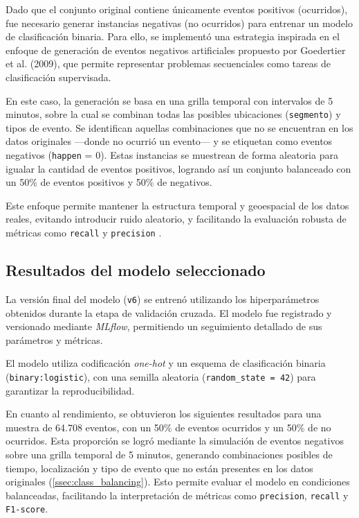 \documentclass[12pt]{article}
\begin{document}
{Dado que el conjunto original contiene únicamente eventos positivos (ocurridos), fue necesario generar instancias negativas (no ocurridos) para entrenar un modelo de clasificación binaria. Para ello, se implementó una estrategia inspirada en el enfoque de generación de eventos negativos artificiales propuesto por Goedertier et al. (2009), que permite representar problemas secuenciales como tareas de clasificación supervisada.

En este caso, la generación se basa en una grilla temporal con intervalos de 5 minutos, sobre la cual se combinan todas las posibles ubicaciones (\texttt{segmento}) y tipos de evento. Se identifican aquellas combinaciones que no se encuentran en los datos originales —donde no ocurrió un evento— y se etiquetan como eventos negativos (\texttt{happen} = 0). Estas instancias se muestrean de forma aleatoria para igualar la cantidad de eventos positivos, logrando así un conjunto balanceado con un 50\% de eventos positivos y 50\% de negativos.

Este enfoque permite mantener la estructura temporal y geoespacial de los datos reales, evitando introducir ruido aleatorio, y facilitando la evaluación robusta de métricas como \texttt{recall} y \texttt{precision} \citep{goedertier2009robust}.


\subsection{Resultados del modelo seleccionado}

La versión final del modelo (\texttt{v6}) se entrenó utilizando los hiperparámetros obtenidos durante la etapa de validación cruzada. El modelo fue registrado y versionado mediante \textit{MLflow}, permitiendo un seguimiento detallado de sus parámetros y métricas.

El modelo utiliza codificación \textit{one-hot} y un esquema de clasificación binaria (\texttt{binary:logistic}), con una semilla aleatoria (\texttt{random\_state = 42}) para garantizar la reproducibilidad.


\noindent En cuanto al rendimiento, se obtuvieron los siguientes resultados para una muestra de 64.708 eventos, con un 50\% de eventos ocurridos y un 50\% de no ocurridos. Esta proporción se logró mediante la simulación de eventos negativos sobre una grilla temporal de 5 minutos, generando combinaciones posibles de tiempo, localización y tipo de evento que no están presentes en los datos originales (\cref{ssec:class_balancing}). Esto permite evaluar el modelo en condiciones balanceadas, facilitando la interpretación de métricas como \texttt{precision}, \texttt{recall} y \texttt{F1-score}.

}
\end{document}
